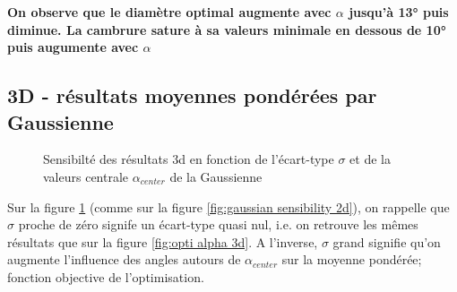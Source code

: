 \documentclass[conference]{IEEEtran}
\begin{document}
\textbf{On observe que le diamètre optimal augmente avec $\alpha$ jusqu'à 13° puis diminue. La cambrure sature à sa valeurs minimale en dessous de 10° puis augumente avec $\alpha$ }

\subsection{3D - résultats moyennes pondérées par Gaussienne}


\begin{figure}[h!]
    \centering
    \hfill 
    \caption{Sensibilté des résultats 3d en fonction de l'écart-type $\sigma$ et de la valeurs centrale $\alpha_{center}$ de la Gaussienne}
    \label{fig:gaussian sensibility}
\end{figure}

    Sur la figure \ref{fig:gaussian sensibility} (comme sur la figure \ref{fig:gaussian sensibility 2d}), on rappelle que $\sigma$ proche de zéro signife un écart-type quasi nul, i.e. on retrouve les mêmes résultats que sur la figure \ref{fig:opti alpha 3d}. A l'inverse, $\sigma$ grand signifie qu'on augmente l'influence des angles autours de $\alpha_{center}$ sur la moyenne pondérée; fonction objective de l'optimisation. \\
\end{document}
